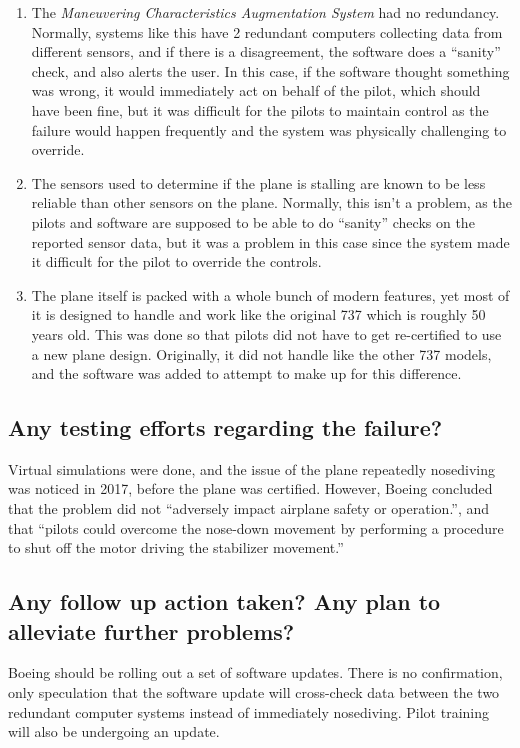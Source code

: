 \documentclass[letterpaper]{article}
\begin{document}
\begin{enumerate}
	\item The \textit{Maneuvering Characteristics Augmentation System} had no redundancy.
	      Normally, systems like this have 2 redundant computers collecting data from different sensors,
	      and if there is a disagreement, the software does a ``sanity'' check, and also alerts the user.
	      In this case, if the software thought something was wrong, it would immediately act on behalf of the pilot,
	      which should have been fine, but it was difficult for the pilots to maintain control as the failure would happen
	      frequently and the system was physically challenging to override.\cite{verge}

	\item The sensors used to determine if the plane is stalling are known to be less reliable than other sensors on the plane.
	      Normally, this isn't a problem, as the pilots and software are supposed to be able to do ``sanity'' checks
	      on the reported sensor data, but it was a problem in this case since the system made it difficult for the pilot to
	      override the controls.\cite{ieeespectrum}

	\item The plane itself is packed with a whole bunch of modern features, yet most of it is designed to handle and work like the
	      original 737 which is roughly 50 years old. This was done so that pilots did not have to get re-certified to use a new plane design.
	      Originally, it did not handle like the other 737 models, and the software was added to attempt to make up for this difference.\cite{verge}

\end{enumerate}


\subsection*{Any testing efforts regarding the failure?}

Virtual simulations were done, and the issue of the plane repeatedly nosediving was noticed in 2017, before the plane was certified.
However, Boeing concluded that the problem did not ``adversely impact airplane safety or operation.'', and that
``pilots could overcome the nose-down movement by performing a procedure to shut off the motor driving the stabilizer movement.''\cite{bloomberg}\cite{goggin_2019}


\subsection*{Any follow up action taken? Any plan to alleviate further problems?}
Boeing should be rolling out a set of software updates\cite{ieeespectrum}\cite{bloomberg}.
There is no confirmation, only speculation that the software update will cross-check data between the two redundant computer systems
instead of immediately nosediving.\cite{ieeespectrum}
Pilot training will also be undergoing an update.\cite{cnn}


\nocite{*}
\printbibliography
\end{document}
